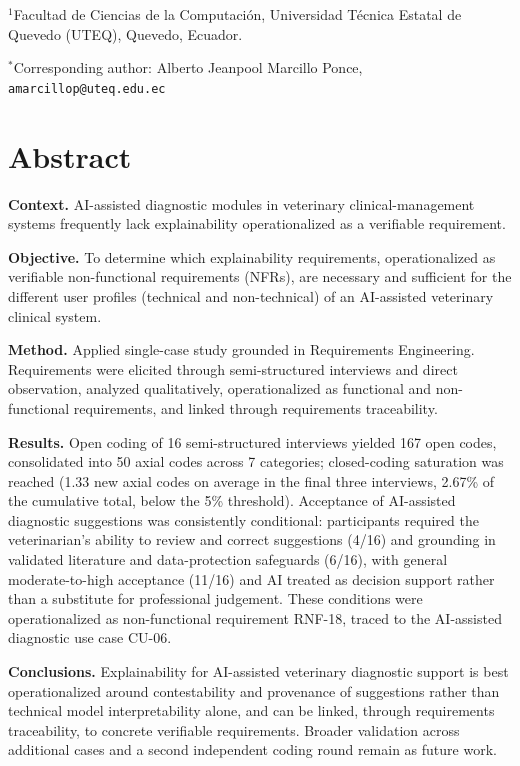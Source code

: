 \documentclass[12pt]{article}
\begin{document}
\noindent
$^{1}$Facultad de Ciencias de la Computación,
Universidad Técnica Estatal de Quevedo (UTEQ),
Quevedo, Ecuador.

\vspace{0.5em}

\noindent
$^{\ast}$Corresponding author:
Alberto Jeanpool Marcillo Ponce,
\texttt{amarcillop@uteq.edu.ec}




\section*{Abstract}

\noindent\textbf{Context.} AI-assisted diagnostic modules in veterinary clinical-management systems frequently lack explainability operationalized as a verifiable requirement.

\noindent\textbf{Objective.} To determine which explainability requirements, operationalized as verifiable non-functional requirements (NFRs), are necessary and sufficient for the different user profiles (technical and non-technical) of an AI-assisted veterinary clinical system.

\noindent\textbf{Method.} Applied single-case study grounded in Requirements Engineering. Requirements were elicited through semi-structured interviews and direct observation, analyzed qualitatively, operationalized as functional and non-functional requirements, and linked through requirements traceability.

\noindent\textbf{Results.} Open coding of 16 semi-structured interviews yielded 167 open codes, consolidated into 50 axial codes across 7 categories; closed-coding saturation was reached (1.33 new axial codes on average in the final three interviews, 2.67\% of the cumulative total, below the 5\% threshold). Acceptance of AI-assisted diagnostic suggestions was consistently conditional: participants required the veterinarian's ability to review and correct suggestions (4/16) and grounding in validated literature and data-protection safeguards (6/16), with general moderate-to-high acceptance (11/16) and AI treated as decision support rather than a substitute for professional judgement. These conditions were operationalized as non-functional requirement RNF-18, traced to the AI-assisted diagnostic use case CU-06.

\noindent\textbf{Conclusions.} Explainability for AI-assisted veterinary diagnostic support is best operationalized around contestability and provenance of suggestions rather than technical model interpretability alone, and can be linked, through requirements traceability, to concrete verifiable requirements. Broader validation across additional cases and a second independent coding round remain as future work.
\end{document}

